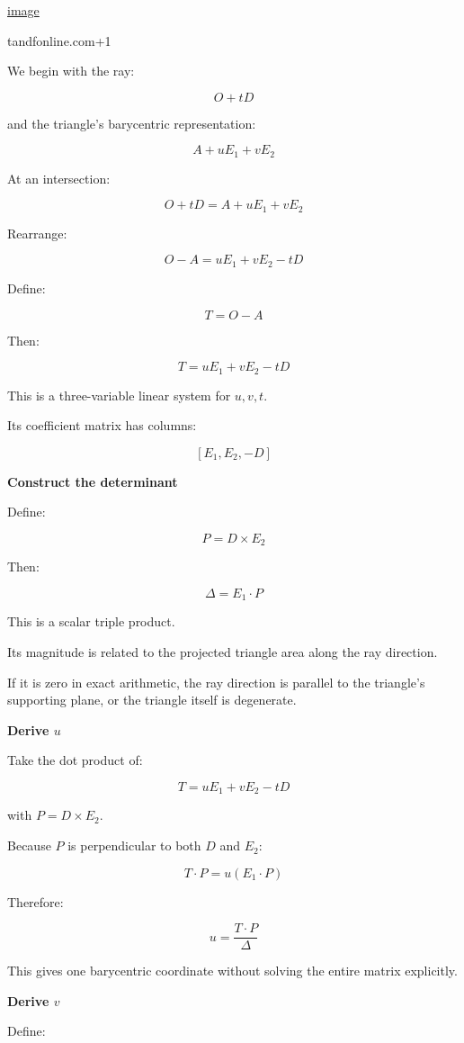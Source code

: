 \href{https://www.google.com/s2/favicons?domain=https://www.tandfonline.com&sz=32}{image}

tandfonline.com+1

We begin with the ray:

\[
O+tD
\]

and the triangle's barycentric representation:

\[
A+uE_1+vE_2
\]

At an intersection:

\[
O+tD=A+uE_1+vE_2
\]

Rearrange:

\[
O-A=uE_1+vE_2-tD
\]

Define:

\[
T=O-A
\]

Then:

\[
\boxed{ T=uE_1+vE_2-tD }
\]

This is a three-variable linear system for \(u,v,t\).

Its coefficient matrix has columns:

\[
[E_1,E_2,-D]
\]

\textbf{Construct the determinant}

Define:

\[
\boxed{ P=D\times E_2 }
\]

Then:

\[
\boxed{ \Delta=E_1\cdot P }
\]

This is a scalar triple product.

Its magnitude is related to the projected triangle area along the ray direction.

If it is zero in exact arithmetic, the ray direction is parallel to the triangle's supporting plane, or the triangle itself is degenerate.

\textbf{Derive \(u\)}

Take the dot product of:

\[
T=uE_1+vE_2-tD
\]

with \(P=D\times E_2\).

Because \(P\) is perpendicular to both \(D\) and \(E_2\):

\[
T\cdot P=u(E_1\cdot P)
\]

Therefore:

\[
\boxed{ u=\frac{T\cdot P}{\Delta} }
\]

This gives one barycentric coordinate without solving the entire matrix explicitly.

\textbf{Derive \(v\)}

Define:


